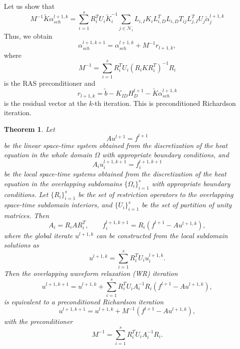 \documentclass[a4paper, 11pt]{article}
\theoremstyle{plain}
\newtheorem{theorem}[equation]{Theorem}
\theoremstyle{definition}
\theoremstyle{remark}
\begin{document}
Let us show that
\begin{equation*}
    M^{-1}\tilde{K}\alpha_{sch}^{l+1, k} = \sum_{i=1}^{s}R_{i}^{T}U_{i}\tilde{K}_{i}^{-1}\sum_{j\in\mathcal{N}_{i}}L_{i, I}K_{i}L_{i, D}^{T}L_{i, D}T_{ij}L_{j, I}^{T}U_{j}\tilde{\alpha}^{l+1, k}_{j}
\end{equation*}
Thus, we obtain
\begin{equation*}
    \boxed{\alpha_{sch}^{l+1, k+1} = \alpha_{sch}^{l+1, k} + M^{-1}r_{l+1, k}},
\end{equation*}
where
\begin{equation*}
    M^{-1} = \sum_{i=1}^{s} R^{T}_{i}U_{i}\left(R_{i}KR_{i}^{T}\right)^{-1}R_{i}
\end{equation*}
is the RAS preconditioner and
\begin{equation*}
    r_{l+1, k} = \tilde{b} - K_{ID}H_{D}^{l+1} - \tilde{K}\alpha_{sch}^{l+1, k}
\end{equation*}
is the residual vector at the $k$-th iteration. This is preconditioned Richardson iteration.
\begin{theorem}
    Let 
    \begin{equation*}
        Au^{l+1} = f^{l+1}
    \end{equation*}
    be the linear space-time system obtained from the discretization of the heat equation in the whole domain $\Omega$ with appropriate boundary conditions, and
    \begin{equation*}
        A_{i}u_{i}^{l+1, k+1} = f_{i}^{l+1, k+1}
    \end{equation*}
    be the local space-time systems obtained from the discretization of the heat equation in the overlapping subdomains $\{\Omega_{i}\}_{i=1}^{s}$ with appropriate boundary conditions. Let $\{R_{i}\}_{i=1}^{s}$ be the set 
    of restriction operators to the overlapping space-time subdomain interiors, and $\{U_{i}\}_{i=1}^{s}$ be the set of partition of unity matrices. Then
    \begin{equation*}
        A_{i} = R_{i}AR_{i}^{T}, \qquad f_{i}^{l+1, k+1} = R_{i}\left(f^{l+1} - Au^{l+1, k}\right),
    \end{equation*}
    where the global iterate $u^{l+1, k}$ can be constructed from the local subdomain solutions as
    \begin{equation*}
        u^{l+1, k} = \sum_{i=1}^{s}R_{i}^{T}U_{i}u_{i}^{l+1, k}.
    \end{equation*}
    Then the overlapping waveform relaxation (WR) iteration
    \begin{equation*}
        u^{l+1, k+1} = u^{l+1, k} + \sum_{i=1}^{s}R_{i}^{T}U_{i}A_{i}^{-1}R_{i}\left(f^{l+1} - Au^{l+1, k}\right),
    \end{equation*}
    is equivalent to a preconditioned Richardson iteration
    \begin{equation*}
        u^{l+1,k+1} = u^{l+1,k} + M^{-1}\left(f^{l+1} - Au^{l+1,k}\right),
    \end{equation*}
    with the preconditioner
    \begin{equation*}
        M^{-1} = \sum_{i=1}^{s} R^{T}_{i}U_{i}A_{i}^{-1}R_{i}.
    \end{equation*}
\end{theorem}
    
\end{document}
